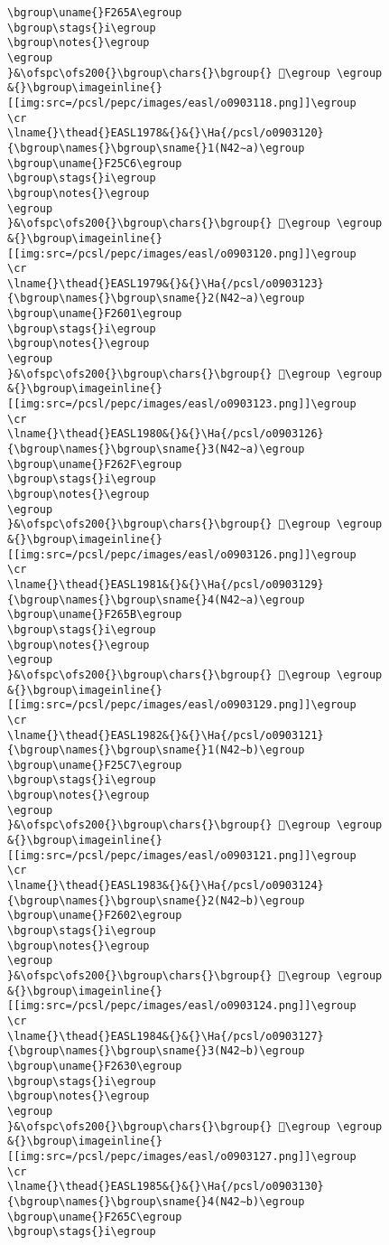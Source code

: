 \begin{verbatim}
\bgroup\uname{}F265A\egroup
\bgroup\stags{}i\egroup
\bgroup\notes{}\egroup
\egroup
}&\ofspc\ofs200{}\bgroup\chars{}\bgroup{} 󲙚\egroup \egroup
&{}\bgroup\imageinline{}[[img:src=/pcsl/pepc/images/easl/o0903118.png]]\egroup
\cr
\lname{}\thead{}EASL1978&{}&{}\Ha{/pcsl/o0903120}{\bgroup\names{}\bgroup\sname{}1(N42∼a)\egroup
\bgroup\uname{}F25C6\egroup
\bgroup\stags{}i\egroup
\bgroup\notes{}\egroup
\egroup
}&\ofspc\ofs200{}\bgroup\chars{}\bgroup{} 󲗆\egroup \egroup
&{}\bgroup\imageinline{}[[img:src=/pcsl/pepc/images/easl/o0903120.png]]\egroup
\cr
\lname{}\thead{}EASL1979&{}&{}\Ha{/pcsl/o0903123}{\bgroup\names{}\bgroup\sname{}2(N42∼a)\egroup
\bgroup\uname{}F2601\egroup
\bgroup\stags{}i\egroup
\bgroup\notes{}\egroup
\egroup
}&\ofspc\ofs200{}\bgroup\chars{}\bgroup{} 󲘁\egroup \egroup
&{}\bgroup\imageinline{}[[img:src=/pcsl/pepc/images/easl/o0903123.png]]\egroup
\cr
\lname{}\thead{}EASL1980&{}&{}\Ha{/pcsl/o0903126}{\bgroup\names{}\bgroup\sname{}3(N42∼a)\egroup
\bgroup\uname{}F262F\egroup
\bgroup\stags{}i\egroup
\bgroup\notes{}\egroup
\egroup
}&\ofspc\ofs200{}\bgroup\chars{}\bgroup{} 󲘯\egroup \egroup
&{}\bgroup\imageinline{}[[img:src=/pcsl/pepc/images/easl/o0903126.png]]\egroup
\cr
\lname{}\thead{}EASL1981&{}&{}\Ha{/pcsl/o0903129}{\bgroup\names{}\bgroup\sname{}4(N42∼a)\egroup
\bgroup\uname{}F265B\egroup
\bgroup\stags{}i\egroup
\bgroup\notes{}\egroup
\egroup
}&\ofspc\ofs200{}\bgroup\chars{}\bgroup{} 󲙛\egroup \egroup
&{}\bgroup\imageinline{}[[img:src=/pcsl/pepc/images/easl/o0903129.png]]\egroup
\cr
\lname{}\thead{}EASL1982&{}&{}\Ha{/pcsl/o0903121}{\bgroup\names{}\bgroup\sname{}1(N42∼b)\egroup
\bgroup\uname{}F25C7\egroup
\bgroup\stags{}i\egroup
\bgroup\notes{}\egroup
\egroup
}&\ofspc\ofs200{}\bgroup\chars{}\bgroup{} 󲗇\egroup \egroup
&{}\bgroup\imageinline{}[[img:src=/pcsl/pepc/images/easl/o0903121.png]]\egroup
\cr
\lname{}\thead{}EASL1983&{}&{}\Ha{/pcsl/o0903124}{\bgroup\names{}\bgroup\sname{}2(N42∼b)\egroup
\bgroup\uname{}F2602\egroup
\bgroup\stags{}i\egroup
\bgroup\notes{}\egroup
\egroup
}&\ofspc\ofs200{}\bgroup\chars{}\bgroup{} 󲘂\egroup \egroup
&{}\bgroup\imageinline{}[[img:src=/pcsl/pepc/images/easl/o0903124.png]]\egroup
\cr
\lname{}\thead{}EASL1984&{}&{}\Ha{/pcsl/o0903127}{\bgroup\names{}\bgroup\sname{}3(N42∼b)\egroup
\bgroup\uname{}F2630\egroup
\bgroup\stags{}i\egroup
\bgroup\notes{}\egroup
\egroup
}&\ofspc\ofs200{}\bgroup\chars{}\bgroup{} 󲘰\egroup \egroup
&{}\bgroup\imageinline{}[[img:src=/pcsl/pepc/images/easl/o0903127.png]]\egroup
\cr
\lname{}\thead{}EASL1985&{}&{}\Ha{/pcsl/o0903130}{\bgroup\names{}\bgroup\sname{}4(N42∼b)\egroup
\bgroup\uname{}F265C\egroup
\bgroup\stags{}i\egroup

\end{verbatim}
